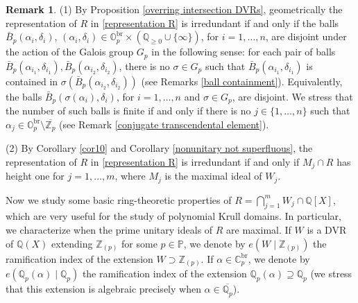 \documentclass[10pt]{article}
\numberwithin{equation}{section}
\theoremstyle{definition}
\newtheorem{Rem}[equation]{Remark}
\theoremstyle{definition}
\newcommand{\Q}{\mathbb{Q}}
\newcommand{\Z}{\mathbb{Z}}
\newcommand{\C}{\mathbb{C}}
\renewcommand{\O}{\mathbb{O}}
\newcommand{\PP}{\mathbb{P}}
\newcommand{\oQp}{\overline{\Q_p}}
\newcommand{\oZp}{\overline{\Z_p}}
\newcommand{\br}{\text{br}}
\begin{document}
\begin{Rem}\label{irredundant represent balls}
(1) By Proposition \ref{overring intersection DVRs},  geometrically the representation of $R$ in \eqref{representation R} is irredundant if and only if the balls $\bar B_p(\alpha_i,\delta_i)$, $(\alpha_i,\delta_i)\in\O_p^{\br}\times(\Q_{\geq0}\cup\{\infty\})$, for $i=1,\ldots,n$, are disjoint under the action of the Galois group $G_p$ in the following sense: for each pair of balls $\bar B_p(\alpha_{i_1},\delta_{i_1}),\bar B_p(\alpha_{i_2},\delta_{i_2})$, there is no $\sigma\in G_p$ such that $\bar B_p(\alpha_{i_1},\delta_{i_1})$ is contained in $\sigma(\bar B_p(\alpha_{i_2},\delta_{i_2}))$ (see Remarks \ref{ball containment}). Equivalently,  the balls $\bar B_p(\sigma(\alpha_i),\delta_i)$, for $i=1,\ldots,n$ and $\sigma\in  G_p$, are disjoint. We stress that the number of such balls is finite if and only if there is no $j\in\{1,\ldots,n\}$ such that $\alpha_j\in\O_p^{\br}\setminus\oZp$ (see Remark \ref{conjugate transcendental element}).

(2) By Corollary \ref{cor10} and Corollary \ref{nonunitary not superfluous},   
the representation of $R$ in \eqref{representation R} is irredundant 
if and only if $M_j\cap R$ has height one for $j=1,\ldots,m$, where $M_j$ is the maximal ideal of $W_j$.
\end{Rem}

Now we study some basic ring-theoretic properties of $R = \bigcap\limits_{j=1}^m W_j\cap\Q[X]$, 
which are very useful for the study of polynomial Krull domains. In particular, we characterize when the prime unitary ideals of $R$ are maximal. If $W$ is a DVR of $\Q(X)$ extending $\Z_{(p)}$ for some $p\in\PP$, we denote by $e(W\mid \Z_{(p)})$ the ramification index of the extension $W\supset\Z_{(p)}$. If $\alpha\in\C_p^{\br}$, we denote by $e(\Q_p(\alpha)\mid\Q_p)$ the ramification index of the extension $\Q_p(\alpha)\supseteq\Q_p$ (we stress that this extension is algebraic precisely when $\alpha\in \oQp$).
\end{document}
